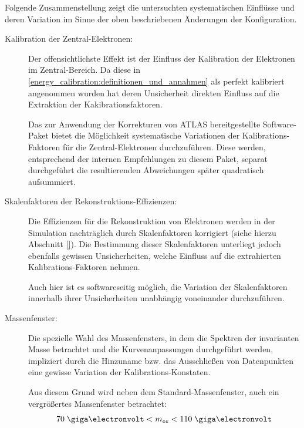 Folgende Zusammenstellung zeigt die untersuchten systematischen Einflüsse und
deren Variation im Sinne der oben beschriebenen Änderungen der Konfiguration.

\begin{description}
    \item[Kalibration der Zentral-Elektronen:]
        Der offensichtlichste Effekt ist der Einfluss der Kalibration der
        Elektronen im Zentral-Bereich. Da diese in
        \ref{energy_calibration:definitionen_und_annahmen} als perfekt
        kalibriert angenommen wurden hat deren Unsicherheit direkten Einfluss
        auf die Extraktion der Kakibrationsfaktoren.
        
        Das zur Anwendung der Korrekturen von ATLAS bereitgestellte
        Software-Paket bietet die Möglichkeit systematische
        Variationen der Kalibrations-Faktoren für die Zentral-Elektronen
        durchzuführen. Diese werden, entsprechend der internen Empfehlungen zu
        diesem Paket, separat durchgeführt die resultierenden Abweichungen
        später quadratisch aufsummiert.

    \item[Skalenfaktoren der Rekonstruktions-Effizienzen:]
        Die Effizienzen für die Rekonstruktion von Elektronen werden in der
        Simulation nachträglich durch Skalenfaktoren korrigiert (siehe hierzu
        Abschnitt \ref{}). Die Bestimmung dieser Skalenfaktoren unterliegt
        jedoch ebenfalls gewissen Unsicherheiten, welche Einfluss auf die
        extrahierten Kalibrations-Faktoren nehmen.

        Auch hier ist es softwareseitig möglich, die Variation der
        Skalenfaktoren innerhalb ihrer Unsicherheiten unabhängig voneinander
        durchzuführen.

    \item[Massenfenster:]
        Die spezielle Wahl des Massenfensters, in dem die Spektren der
        invarianten Masse betrachtet und die Kurvenanpassungen durchgeführt
        werden, impliziert durch die Hinzuname bzw. das Ausschließen von
        Datenpunkten eine gewisse Variation der Kalibrations-Konstaten.

        Aus diesem Grund wird neben dem Standard-Massenfenster, auch ein
        vergrößertes Massenfenster betrachtet:
        \[
            70 \GeV < m_{ee} < 110 \GeV
        \]


\end{description}
